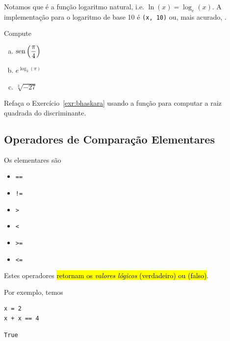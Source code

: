 \documentclass[12pt]{article}
\begin{document}
\begin{obs}
  Notamos que {\PYTHONmathDOTlog} é a função logaritmo natural, i.e. $\ln(x) = \log_e(x)$. A implementação {\python} para o logaritmo de base 10 é {\PYTHONmathDOTlog}\texttt{(x, 10)} ou, mais acurado, {\PYTHONmathDOTlogTen}.
\end{obs}

\begin{exr}
  Compute
  \begin{enumerate}[a)]
  \item $\displaystyle \operatorname{sen}\left(\frac{\pi}{4}\right)$
  \item $\displaystyle e^{\log_3(\pi)}$
  \item $\displaystyle \sqrt[3]{-27}$
  \end{enumerate}
\end{exr}

\begin{exr}
  Refaça o Exercício~\ref{exr:bhaskara} usando a função {\PYTHONmathDOTsqrt} para computar a raiz quadrada do discriminante.
\end{exr}

\subsection{Operadores de Comparação Elementares}

Os  elementares são
\begin{itemize}
\item[]\lstinline+==+ 
\item[]\lstinline+!=+ 
\item[]\lstinline+>+ 
\item[]\lstinline+<+ 
\item[]\lstinline+>=+ 
\item[]\lstinline+<=+ 
\end{itemize}
Estes operadores \hl{retornam os \emph{valores lógicos} {\PYTHONTrue} (verdadeiro) ou {\PYTHONFalse} (falso)}.

Por exemplo, temos

\begin{lstlisting}
x = 2
x + x == 4
\end{lstlisting}

\begin{verbatim}
True
\end{verbatim}
\end{document}
